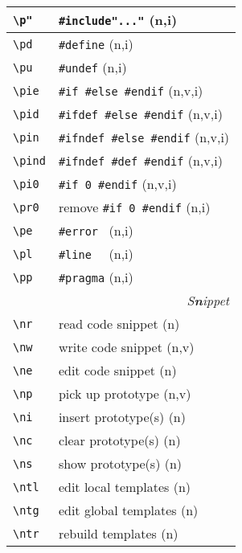 \documentclass[oneside,10pt,a4paper,DIV24]{scrartcl}
\begin{document}
\begin{center}
\begin{tabular}[]{|p{14mm}|p{58mm}|}
\hline \verb'\p"'   & \verb$#include"..."$         \hfill (n,i)\\
\hline \verb'\pd'   & \verb'#define'               \hfill (n,i)\\
\hline \verb'\pu'   & \verb'#undef'                \hfill (n,i)\\
\hline \verb'\pie'  & \verb'#if #else #endif'      \hfill (n,v,i)\\
\hline \verb'\pid'  & \verb'#ifdef #else #endif'   \hfill (n,v,i)\\
\hline \verb'\pin'  & \verb'#ifndef #else #endif'  \hfill (n,v,i)\\
\hline \verb'\pind' & \verb'#ifndef #def #endif'   \hfill (n,v,i)\\
\hline \verb'\pi0'  & \verb'#if 0 #endif'          \hfill (n,v,i)\\
\hline \verb'\pr0'  & remove \verb'#if 0 #endif'   \hfill (n,i)\\
\hline \verb'\pe'   & \verb'#error '               \hfill (n,i)\\
\hline \verb'\pl'   & \verb'#line  '               \hfill (n,i)\\
\hline \verb'\pp'   & \verb'#pragma'               \hfill (n,i)\\
\hline
\hline 
\multicolumn{2}{|r|}{\textsl{S\textbf{n}ippet}} \\
\hline \verb'\nr'  & read code snippet         \hfill (n)\\
\hline \verb'\nw'  & write code snippet        \hfill (n,v)\\
\hline \verb'\ne'  & edit code snippet         \hfill (n)\\
\hline \verb'\np'  & pick up prototype         \hfill (n,v)\\
\hline \verb'\ni'  & insert prototype(s)       \hfill (n)\\
\hline \verb'\nc'  & clear  prototype(s)       \hfill (n)\\
\hline \verb'\ns'  & show   prototype(s)       \hfill (n)\\
%
\hline \verb'\ntl' & edit local templates      \hfill (n)\\
\hline \verb'\ntg' & edit global templates     \hfill (n)\\
\hline \verb'\ntr' & rebuild templates         \hfill (n)\\
\hline
\end{tabular} \\


\end{center}
\end{document}
